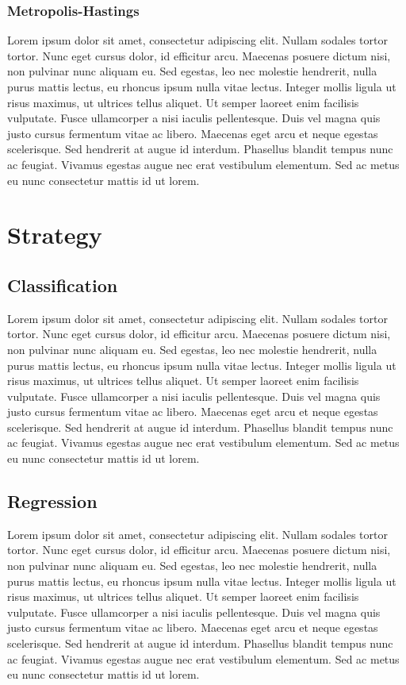 \subsubsection{Metropolis-Hastings}
Lorem ipsum dolor sit amet, consectetur adipiscing elit. Nullam sodales tortor tortor. Nunc eget cursus dolor, id efficitur arcu. Maecenas posuere dictum nisi, non pulvinar nunc aliquam eu. Sed egestas, leo nec molestie hendrerit, nulla purus mattis lectus, eu rhoncus ipsum nulla vitae lectus. Integer mollis ligula ut risus maximus, ut ultrices tellus aliquet. Ut semper laoreet enim facilisis vulputate. Fusce ullamcorper a nisi iaculis pellentesque. Duis vel magna quis justo cursus fermentum vitae ac libero. Maecenas eget arcu et neque egestas scelerisque. Sed hendrerit at augue id interdum. Phasellus blandit tempus nunc ac feugiat. Vivamus egestas augue nec erat vestibulum elementum. Sed ac metus eu nunc consectetur mattis id ut lorem.

\section{Strategy}

\subsection{Classification}
Lorem ipsum dolor sit amet, consectetur adipiscing elit. Nullam sodales tortor tortor. Nunc eget cursus dolor, id efficitur arcu. Maecenas posuere dictum nisi, non pulvinar nunc aliquam eu. Sed egestas, leo nec molestie hendrerit, nulla purus mattis lectus, eu rhoncus ipsum nulla vitae lectus. Integer mollis ligula ut risus maximus, ut ultrices tellus aliquet. Ut semper laoreet enim facilisis vulputate. Fusce ullamcorper a nisi iaculis pellentesque. Duis vel magna quis justo cursus fermentum vitae ac libero. Maecenas eget arcu et neque egestas scelerisque. Sed hendrerit at augue id interdum. Phasellus blandit tempus nunc ac feugiat. Vivamus egestas augue nec erat vestibulum elementum. Sed ac metus eu nunc consectetur mattis id ut lorem.

\subsection{Regression}
Lorem ipsum dolor sit amet, consectetur adipiscing elit. Nullam sodales tortor tortor. Nunc eget cursus dolor, id efficitur arcu. Maecenas posuere dictum nisi, non pulvinar nunc aliquam eu. Sed egestas, leo nec molestie hendrerit, nulla purus mattis lectus, eu rhoncus ipsum nulla vitae lectus. Integer mollis ligula ut risus maximus, ut ultrices tellus aliquet. Ut semper laoreet enim facilisis vulputate. Fusce ullamcorper a nisi iaculis pellentesque. Duis vel magna quis justo cursus fermentum vitae ac libero. Maecenas eget arcu et neque egestas scelerisque. Sed hendrerit at augue id interdum. Phasellus blandit tempus nunc ac feugiat. Vivamus egestas augue nec erat vestibulum elementum. Sed ac metus eu nunc consectetur mattis id ut lorem.
